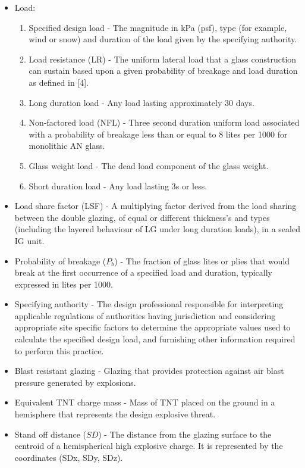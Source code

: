 \documentclass[12pt]{article}
\begin{document}
\begin{itemize}
\item{Load:}
\begin{enumerate}
\item{Specified design load - The magnitude in kPa (psf), type (for example, wind or snow) and duration of the load given by the specifying authority.}
\item{Load resistance (LR) - The uniform lateral load that a glass construction can sustain based upon a given probability of breakage and load duration as defined in [4].}
\item{Long duration load - Any load lasting approximately 30 days.}
\item{Non-factored load (NFL) - Three second duration uniform load associated with a probability of breakage less than or equal to 8 lites per 1000 for monolithic AN glass.}
\item{Glass weight load - The dead load component of the glass weight.}
\item{Short duration load - Any load lasting 3s or less.}
\end{enumerate}
\item{Load share factor (LSF) - A multiplying factor derived from the load sharing between the double glazing, of equal or different thickness's and types (including the layered behaviour of LG under long duration loads), in a sealed IG unit.}
\item{Probability of breakage ($P_{b}$) - The fraction of glass lites or plies that would break at the first occurrence of a specified load and duration, typically expressed in lites per 1000.}
\item{Specifying authority - The design professional responsible for interpreting applicable regulations of authorities having jurisdiction and considering appropriate site specific factors to determine the appropriate values used to calculate the specified design load, and furnishing other information required to perform this practice.}
\item{Blast resistant glazing - Glazing that provides protection against air blast pressure generated by explosions.}
\item{Equivalent TNT charge mass - Mass of TNT placed on the ground in a hemisphere that represents the design explosive threat.}
\item{Stand off distance ($SD$) - The distance from the glazing surface to the centroid of a hemispherical high explosive charge. It is represented by the coordinates (SDx, SDy, SDz).}
\end{itemize}
\end{document}
